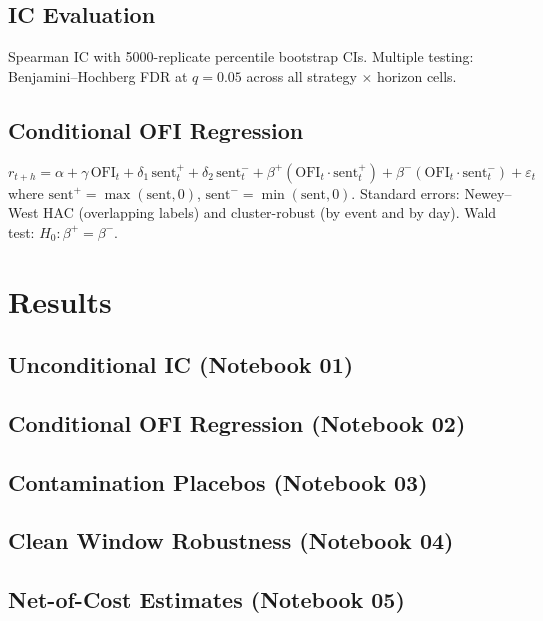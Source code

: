 \documentclass[12pt, letterpaper]{article}
\begin{document}
\subsection{IC Evaluation}
Spearman IC with 5000-replicate percentile bootstrap CIs.
Multiple testing: Benjamini--Hochberg FDR at $q = 0.05$ across all
strategy $\times$ horizon cells.

\subsection{Conditional OFI Regression}
\begin{equation}
  r_{t+h} = \alpha + \gamma\,\text{OFI}_t
  + \delta_1\,\text{sent}^+_t + \delta_2\,\text{sent}^-_t
  + \beta^+(\text{OFI}_t \cdot \text{sent}^+_t)
  + \beta^-(\text{OFI}_t \cdot \text{sent}^-_t)
  + \varepsilon_t
\end{equation}
where $\text{sent}^+ = \max(\text{sent}, 0)$,
$\text{sent}^- = \min(\text{sent}, 0)$.
Standard errors: Newey--West HAC (overlapping labels) and cluster-robust
(by event and by day).  Wald test: $H_0\colon \beta^+ = \beta^-$.


\section{Results}
\label{sec:results}


\subsection{Unconditional IC (Notebook 01)}
\subsection{Conditional OFI Regression (Notebook 02)}
\subsection{Contamination Placebos (Notebook 03)}
\subsection{Clean Window Robustness (Notebook 04)}
\subsection{Net-of-Cost Estimates (Notebook 05)}
\end{document}
